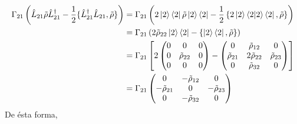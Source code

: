 \begin{equation}
\begin{split}
    \Gamma_{21} \left( \hat{L}_{21} \tilde{\rho} \hat{L}_{21}^{\dagger} - \frac{1}{2} \{\hat{L}_{21}^{\dagger} \hat{L}_{21}, \tilde{\rho}\} \right) &= \Gamma_{21} \left(2 \ket{2}\bra{2}\tilde{\rho} \ket{2} \bra{2} - \frac{1}{2}  \left\{2 \ket{2} \bra{2}\ket{2}\bra{2} , \tilde{\rho}\right\} \right) \\
    &= \Gamma_{21} \left(2 \tilde{\rho}_{22} \ket{2}\bra{2} -  \left\{\ket{2}\bra{2},\tilde{\rho}\right\} \right) \\
    &= \Gamma_{21} \left[ 2 \begin{pmatrix}
        0 & 0 &  0\\
        0 & \tilde{\rho}_{22} & 0 \\
        0 & 0 & 0 \\
    \end{pmatrix}
    - \begin{pmatrix}
       0 & \tilde{\rho}_{12} & 0 \\
        \tilde{\rho}_{21} &  2 \tilde{\rho}_{22} &  \tilde{\rho}_{23} \\
        0 & \tilde{\rho}_{32} & 0 \\ 
    \end{pmatrix} \right] \\
    &= \Gamma_{21} \begin{pmatrix}
       0 & - \tilde{\rho}_{12} & 0 \\
        -\tilde{\rho}_{21} &  0 &  -\tilde{\rho}_{23} \\
        0 & -\tilde{\rho}_{32} & 0 \\ 
    \end{pmatrix}
\end{split}
\end{equation}
De ésta forma, 
